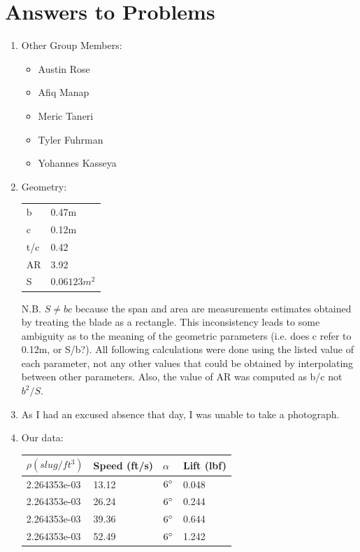 \documentclass{article}
\begin{document}
\section*{Answers to Problems}
\begin{enumerate}

\item Other Group Members:
\begin{itemize}
\item Austin Rose
\item Afiq Manap
\item Meric Taneri
\item Tyler Fuhrman
\item Yohannes Kasseya
\end{itemize}

\item Geometry:

\begin{tabular}{l   l}
b & 0.47m \\
c & 0.12m \\
t/c & 0.42 \\
AR & 3.92 \\
S & $0.06123 m^2$ \\
\end{tabular}

N.B. $S \neq bc$ because the span and area are measurements estimates obtained by treating
the blade as a rectangle.  This inconsistency leads to some ambiguity as to the meaning of
the geometric parameters (i.e. does c refer to 0.12m, or S/b?).  All following calculations
were done using the listed value of each parameter, not any other values that could be obtained
by interpolating between other parameters.  Also, the value of AR was computed as b/c not $b^2 / S$.

\item As I had an excused absence that day, I was unable to take a photograph.

\item Our data:

\begin{tabular}{|l | l | l | l |}
\hline
$\rho (slug/ft^3)$ & Speed (ft/s) & $\alpha$ & Lift (lbf) \\ \hline
2.264353e-03 & 13.12 & $6\degree$ & 0.048 \\ \hline
2.264353e-03 & 26.24 & $6\degree$ & 0.244 \\ \hline
2.264353e-03 & 39.36 & $6\degree$ & 0.644 \\ \hline
2.264353e-03 & 52.49 & $6\degree$ & 1.242 \\ \hline
\end{tabular}


\end{enumerate}
\end{document}
